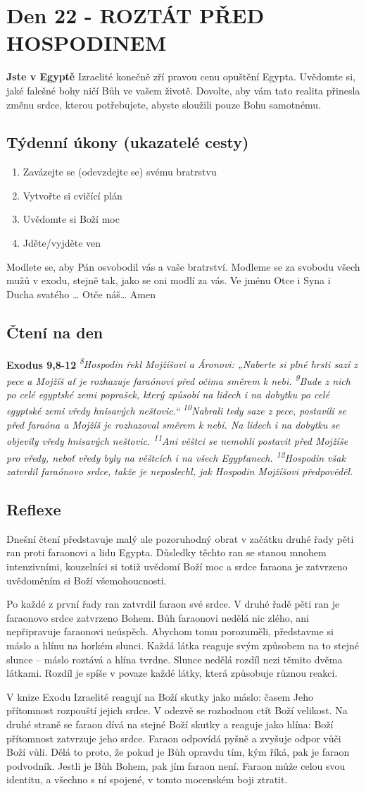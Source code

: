 \documentclass[11pt]{article}
\newcommand{\zacatekCtvrtyTyden}{
  \textbf{Jste v Egyptě} \newline
  Izraelité konečně zří pravou cenu opuštění Egypta. Uvědomte si, jaké falešné bohy ničí Bůh ve vašem životě.
Dovolte, aby vám tato realita přinesla změnu srdce, kterou potřebujete, abyste sloužili pouze Bohu samotnému.

\subsection*{Týdenní úkony (ukazatelé cesty)}
\begin{enumerate}
  \item Zavázejte se (odevzdejte se) svému bratrstvu
  \item Vytvořte si cvičící plán
  \item Uvědomte si Boží moc
  \item Jděte/vyjděte ven
\end{enumerate}
Modlete se, aby Pán osvobodil vás a vaše bratrství. \newline
Modleme se za svobodu všech mužů v exodu, stejně tak, jako se oni modlí za vás.\newline
Ve jménu Otce i Syna i Ducha svatého …  Otče náš… Amen
}
\begin{document}
\newpage
\section{Den 22 - ROZTÁT PŘED HOSPODINEM}
\zacatekCtvrtyTyden
\subsection*{Čtení na den}
\textbf{Exodus 9,8-12}
\newline
\textit{
\textsuperscript{8}Hospodin řekl Mojžíšovi a Áronovi: „Naberte si plné hrsti sazí z pece a Mojžíš ať je rozhazuje faraónovi před očima směrem k nebi.
\textsuperscript{9}Bude z nich po celé egyptské zemi poprašek, který způsobí na lidech i na dobytku po celé egyptské zemi vředy hnisavých neštovic.“
\textsuperscript{10}Nabrali tedy saze z pece, postavili se před faraóna a Mojžíš je rozhazoval směrem k nebi. Na lidech i na dobytku se objevily vředy hnisavých neštovic.
\textsuperscript{11}Ani věštci se nemohli postavit před Mojžíše pro vředy, neboť vředy byly na věštcích i na všech Egypťanech.
\textsuperscript{12}Hospodin však zatvrdil faraónovo srdce, takže je neposlechl, jak Hospodin Mojžíšovi předpověděl.
}

\subsection*{Reflexe}

Dnešní čtení představuje malý ale pozoruhodný obrat v začátku druhé řady pěti ran proti faraonovi a lidu Egypta.
Důsledky těchto ran se stanou mnohem intenzivními, kouzelníci si totiž uvědomí Boží moc a srdce faraona je
zatvrzeno uvědoměním si Boží všemohoucnosti.

Po každé z první řady ran zatvrdil faraon své srdce. V druhé řadě pěti ran je faraonovo srdce zatvrzeno Bohem. Bůh
faraonovi nedělá nic zlého, ani nepřipravuje faraonovi neúspěch. Abychom tomu porozuměli, představme si máslo
a hlínu na horkém slunci. Každá látka reaguje svým způsobem na to stejné slunce – máslo roztává a hlína tvrdne.
Slunce nedělá rozdíl nezi těmito dvěma látkami. Rozdíl je spíše v povaze každé látky, která způsobuje různou
reakci.

V knize Exodu Izraelité reagují na Boží skutky jako máslo: časem Jeho přítomnost rozpouští jejich srdce. V odezvě
se rozhodnou ctít Boží velikost. Na druhé straně se faraon dívá na stejné Boží skutky a reaguje jako hlína: Boží
přítomnost zatvrzuje jeho srdce. Faraon odpovídá pyšně a zvyšuje odpor vůči Boží vůli. Dělá to proto, že pokud je
Bůh opravdu tím, kým říká, pak je faraon podvodník. Jestli je Bůh Bohem, pak jím faraon není. Faraon může celou
svou identitu, a všechno s ní spojené, v tomto mocenském boji ztratit.
\end{document}
